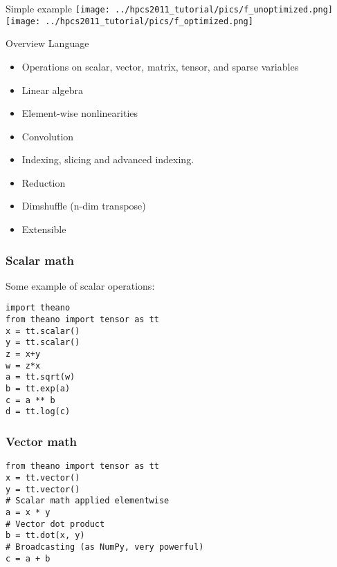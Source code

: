 \documentclass[utf8x,xcolor=pdftex,dvipsnames,table]{beamer}
\begin{document}
\begin{frame}{Simple example}
\center
\texttt{[image: ../hpcs2011\_tutorial/pics/f\_unoptimized.png]}
\hspace{0.1\textwidth}
\texttt{[image: ../hpcs2011\_tutorial/pics/f\_optimized.png]}
\end{frame}



\begin{frame}{Overview Language}
  \begin{itemize}
  \item Operations on scalar, vector, matrix, tensor, and sparse variables
  \item Linear algebra
  \item Element-wise nonlinearities
  \item Convolution
  \item Indexing, slicing and advanced indexing.
  \item Reduction
  \item Dimshuffle (n-dim transpose)
  \item Extensible
  \end{itemize}
\end{frame}


\begin{frame}[fragile]
  \frametitle{Scalar math}
Some example of scalar operations:
\begin{lstlisting}
import theano
from theano import tensor as tt
x = tt.scalar()
y = tt.scalar()
z = x+y
w = z*x
a = tt.sqrt(w)
b = tt.exp(a)
c = a ** b
d = tt.log(c)
\end{lstlisting}
\end{frame}

\begin{frame}[fragile]
  \frametitle{Vector math}

\begin{lstlisting}
from theano import tensor as tt
x = tt.vector()
y = tt.vector()
# Scalar math applied elementwise
a = x * y
# Vector dot product
b = tt.dot(x, y)
# Broadcasting (as NumPy, very powerful)
c = a + b
\end{lstlisting}
\end{frame}
\end{document}
